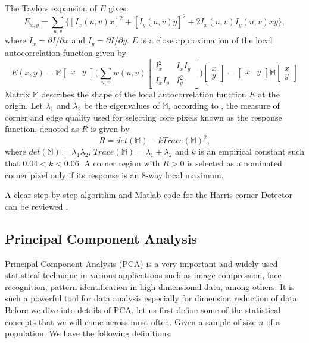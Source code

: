 \documentclass[10pt,a4paper]{article}
\begin{document}
      The Taylors expansion of $E$ gives:
      \begin{equation}
      E_{x,y} = \sum_{u,v} \{[I_x (u,v)x]^2 + [I_y(u,v)y]^2 + 2I_x(u,v)I_y (u,v)xy\},
      \end{equation}  
      where $I_x = \partial I / \partial x$ and $I_y = \partial I /\partial y$. $E$ is a close approximation of the local autocorrelation function given by
      \begin{equation}
      E(x,y) = \mathbb{M}\begin{bmatrix}
      x & y
      \end{bmatrix} \Bigg(\sum_{u,v} w(u,v)  
       \begin{bmatrix}
       I_x ^2 & I_x I_y  \\
       I_xI_y & I_y ^2
       \end{bmatrix}  \Bigg)\begin{bmatrix}
      x \\
      y
      \end{bmatrix}  = \begin{bmatrix}
      x & y
      \end{bmatrix} \mathbb{M}\begin{bmatrix}
      x \\
      y
      \end{bmatrix}
      \end{equation}
      Matrix $\mathbb{M}$ describes the shape of the local autocorrelation function $E$ at the origin.
      Let $\lambda_1$ and $\lambda_2$ be the eigenvalues of $\mathbb{M}$, according to \citep{harris1988combined}, the measure of corner and edge quality used for selecting core pixels known as the response function, denoted as $R$ is given by
      \begin{equation}
      R = det(\mathbb{M}) - kTrace(\mathbb{M})^2,
      \end{equation}       
      where $det(\mathbb{M})=\lambda_1 \lambda_2$, $Trace(\mathbb{M}) = \lambda_1+ \lambda_2$ and $k$ is an empirical constant such that $0.04 <k < 0.06$.
      A corner region with $R>0$ is selected as a nominated corner pixel only if its response is an $8$-way local maximum.
      
      A clear step-by-step algorithm and Matlab code for the Harris corner Detector can be reviewed \citep{stoica2011delaunay}.
      
      
     \subsection{Principal Component Analysis}
	  Principal Component Analysis (PCA) is a very important and widely used statistical technique in various applications such as image compression, face recognition, pattern identification in high dimensional data, among others. It is such a powerful tool for data analysis especially for dimension reduction of data. Before we dive into details of PCA, let us first define some of the statistical concepts that we will come across most often. Given a sample of size $n$ of a population. We have the following definitions:
	  
\end{document}
